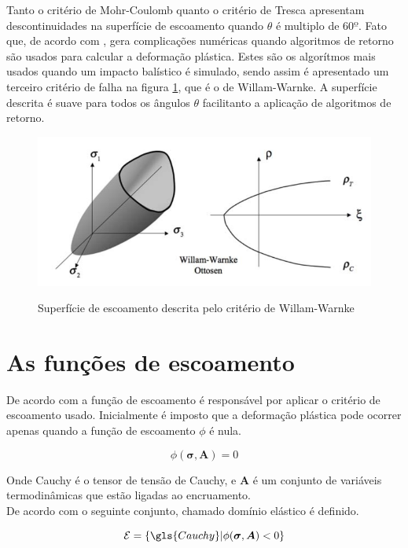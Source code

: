 Tanto o critério de Mohr-Coulomb quanto o critério de Tresca apresentam descontinuidades na superfície de escoamento quando $\theta$ é multiplo de $ 60º $. Fato que, de acordo com  \cite{hiermaier_2008}, gera complicações numéricas quando algoritmos de retorno são usados para calcular a deformação plástica. Estes são os algorítmos mais usados quando um impacto balístico é simulado, sendo assim é apresentado um terceiro critério de falha na figura \ref{fig:Willamwarnke}, que é o de Willam-Warnke. A superfície descrita é suave para todos os ângulos $\theta$ facilitanto a aplicação de algoritmos de retorno. 

\begin{figure}
    \centering
    \caption{Superfície de escoamento descrita pelo critério de Willam-Warnke}
    \includegraphics[width=0.7\linewidth]{images/willianwarnke.png} 
    \label{fig:Willamwarnke}
\end{figure}

\section{As funções de escoamento}

De acordo com \cite{neto_peric_owens_2008} a função de escoamento é responsável por aplicar o critério de escoamento usado. Inicialmente é imposto que a deformação plástica pode ocorrer apenas quando a função de escoamento $ \phi $ é nula.

\begin{equation}
     \phi(\boldsymbol{\sigma}, \boldsymbol{A}) = 0 
\end{equation}

Onde \gls{Cauchy} é o tensor de tensão de Cauchy, e $\boldsymbol{A}$ é um conjunto de variáveis termodinâmicas que estão ligadas ao encruamento.\\

De acordo com \cite{neto_peric_owens_2008} o seguinte conjunto, chamado domínio elástico é definido. 

\begin{equation}
    \mathcal{E} = \{ \gls{Cauchy} | \phi(\boldsymbol{\sigma}, \boldsymbol{A}) < 0   \}
\end{equation}

